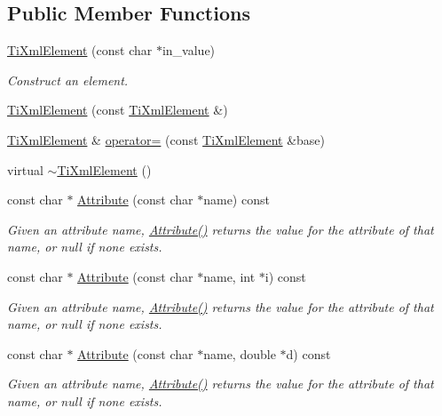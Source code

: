 \subsection*{Public Member Functions}
\begin{DoxyCompactItemize}
\item 
\hyperlink{class_ti_xml_element_a01bc3ab372d35da08efcbbe65ad90c60}{TiXmlElement} (const char $\ast$in\_\-value)
\begin{DoxyCompactList}\small\item\em Construct an element. \end{DoxyCompactList}\item 
\hyperlink{class_ti_xml_element_a1ca4465f3c2eac6a60e641cd7f1d9f7e}{TiXmlElement} (const \hyperlink{class_ti_xml_element}{TiXmlElement} \&)
\item 
\hyperlink{class_ti_xml_element}{TiXmlElement} \& \hyperlink{class_ti_xml_element_ad58d300f4cfc0016ffa6861ebb718a0b}{operator=} (const \hyperlink{class_ti_xml_element}{TiXmlElement} \&base)
\item 
virtual \hyperlink{class_ti_xml_element_aa049a47c5081c0d021968666360da261}{$\sim$TiXmlElement} ()
\item 
const char $\ast$ \hyperlink{class_ti_xml_element_ac1e4691e9375ba4e665dce7e46a50a9c}{Attribute} (const char $\ast$name) const 
\begin{DoxyCompactList}\small\item\em Given an attribute name, \hyperlink{class_ti_xml_element_ac1e4691e9375ba4e665dce7e46a50a9c}{Attribute()} returns the value for the attribute of that name, or null if none exists. \end{DoxyCompactList}\item 
const char $\ast$ \hyperlink{class_ti_xml_element_aa9192e80567b5042dbded80b78c44339}{Attribute} (const char $\ast$name, int $\ast$i) const 
\begin{DoxyCompactList}\small\item\em Given an attribute name, \hyperlink{class_ti_xml_element_ac1e4691e9375ba4e665dce7e46a50a9c}{Attribute()} returns the value for the attribute of that name, or null if none exists. \end{DoxyCompactList}\item 
const char $\ast$ \hyperlink{class_ti_xml_element_aec4f727f8aa49b51248d80125d173136}{Attribute} (const char $\ast$name, double $\ast$d) const 
\begin{DoxyCompactList}\small\item\em Given an attribute name, \hyperlink{class_ti_xml_element_ac1e4691e9375ba4e665dce7e46a50a9c}{Attribute()} returns the value for the attribute of that name, or null if none exists. \end{DoxyCompactList}\item 

\end{DoxyCompactItemize}
